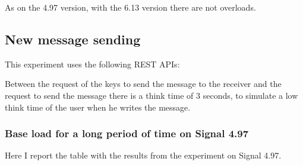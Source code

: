 As on the 4.97 version, with the 6.13 version there are not overloads.

\subsection{New message sending\label{sec:newmessage}}

This experiment uses the following REST APIs:

\begin{table}[H]
\caption{Sequence of calls to send a message}
\label{tab:apimessage}
\end{table}

Between the request of the keys to send the message to the receiver and the request to send the message there is a think time of $3$ seconds, to simulate a low think time of the user when he writes the message.



\subsubsection{Base load for a long period of time on Signal 4.97}

Here I report the table with the results from the experiment on Signal 4.97.

